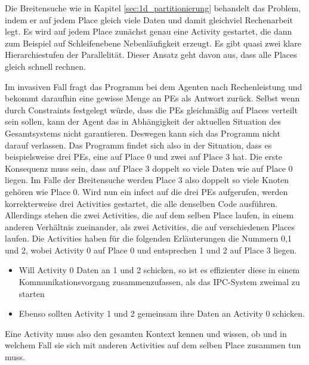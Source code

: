 Die Breitensuche wie in Kapitel \ref{sec:1d_partitionierung} behandelt das Problem, indem er auf jedem Place gleich viele Daten und damit gleichviel Rechenarbeit legt. Es wird auf jedem Place zunächst genau eine Activity gestartet, die dann zum Beispiel auf Schleifenebene Nebenläufigkeit erzeugt. Es gibt quasi zwei klare Hierarchiestufen der Parallelität. Dieser Ansatz geht davon aus, dass alle Places gleich schnell rechnen.

Im invasiven Fall fragt das Programm bei dem Agenten nach Rechenleistung und bekommt daraufhin eine gewisse Menge an PEs als Antwort zurück. Selbst wenn durch Constraints festgelegt würde, dass die PEs gleichmäßig auf Places verteilt sein sollen, kann der Agent das in Abhängigkeit der aktuellen Situation des Gesamtsystems nicht garantieren. Deswegen kann sich das Programm nicht darauf verlassen. Das Programm findet sich also in der Situation, dass es beispielsweise drei PEs, eine auf Place 0 und zwei auf Place 3 hat. Die erste Konsequenz muss sein, dass auf Place 3 doppelt so viele Daten wie auf Place 0 liegen. Im Falle der Breitensuche werden Place 3 also doppelt so viele Knoten gehören wie Place 0. Wird nun ein infect auf die drei PEs aufgerufen, werden korrekterweise drei Activities gestartet, die alle denselben Code ausführen. Allerdings stehen die zwei Activities, die auf dem selben Place laufen, in einem anderen Verhältnis zueinander, als zwei Activities, die auf verschiedenen Places laufen. Die Activities haben für die folgenden Erläuterungen die Nummern 0,1 und 2, wobei Activity 0 auf Place 0 und entsprechen 1 und 2 auf Place 3 liegen.
\begin{itemize}
	\item Will Activity 0 Daten an 1 und 2 schicken, so ist es effizienter diese in einem Kommunikationsvorgang zusammenzufassen, als das IPC-System zweimal zu starten
	\item Ebenso sollten Activity 1 und 2 gemeinsam ihre Daten an Activity 0 schicken.
\end{itemize}
Eine Activity muss also den gesamten Kontext kennen und wissen, ob und in welchem Fall sie sich mit anderen Activities auf dem selben Place zusammen tun muss.

